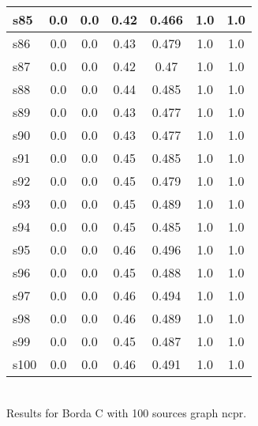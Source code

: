 \documentclass{article}
\begin{document}
\begin{tabular}{|l|c|c|c|c|c|c|}
\hline
s85 &0.0 & 0.0 & 0.42 & 0.466 & 1.0 & 1.0\\
\hline
s86 &0.0 & 0.0 & 0.43 & 0.479 & 1.0 & 1.0\\
\hline
s87 &0.0 & 0.0 & 0.42 & 0.47 & 1.0 & 1.0\\
\hline
s88 &0.0 & 0.0 & 0.44 & 0.485 & 1.0 & 1.0\\
\hline
s89 &0.0 & 0.0 & 0.43 & 0.477 & 1.0 & 1.0\\
\hline
s90 &0.0 & 0.0 & 0.43 & 0.477 & 1.0 & 1.0\\
\hline
s91 &0.0 & 0.0 & 0.45 & 0.485 & 1.0 & 1.0\\
\hline
s92 &0.0 & 0.0 & 0.45 & 0.479 & 1.0 & 1.0\\
\hline
s93 &0.0 & 0.0 & 0.45 & 0.489 & 1.0 & 1.0\\
\hline
s94 &0.0 & 0.0 & 0.45 & 0.485 & 1.0 & 1.0\\
\hline
s95 &0.0 & 0.0 & 0.46 & 0.496 & 1.0 & 1.0\\
\hline
s96 &0.0 & 0.0 & 0.45 & 0.488 & 1.0 & 1.0\\
\hline
s97 &0.0 & 0.0 & 0.46 & 0.494 & 1.0 & 1.0\\
\hline
s98 &0.0 & 0.0 & 0.46 & 0.489 & 1.0 & 1.0\\
\hline
s99 &0.0 & 0.0 & 0.45 & 0.487 & 1.0 & 1.0\\
\hline
s100 &0.0 & 0.0 & 0.46 & 0.491 & 1.0 & 1.0\\
\hline
\end{tabular}\\

\noindent Results for Borda C with 100 sources graph ncpr.
\end{document}
